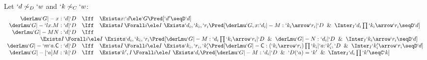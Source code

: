 \documentclass{lmcs}
\begin{document}
\newpage

\def\derLmuInt{\derLmu}

 \begin{lem} \label{mu gen Lemma} \label{gen lemma}
Let $`d \not\sim_D `w$ and $`k \not\sim_C`w$:
%
 \[ \begin{array}{rcl}
\derLmuInt `G |- x : `d | `D &\Iff& \Exists x{:}`d \ele `G \Pred[ `d' \seqD `d ]
	\\
\derLmuInt `G |- `lx.M : `d | `D &\Iff& 
\Exists I \, \Forall i \ele I ~ \Exists `d_i,`k_i,`r_i \Pred[ \derLmuInt `G, x{:}`d_i |- M : `k_i\arrow `r_i | `D \And \Inter_I `d_i\prod `k_i\arrow `r_i \seqD `d ] 
	\\
\derLmuInt `G |- MN : `d | `D &\Iff& 
\\ \multicolumn{3}{r} {
\Exists I \, \Forall i \ele I ~ \Exists `d_i,`k_i,`r_i \Pred[ \derLmuInt `G |- M : `d_i\prod `k_i\arrow `r_i | `D \And \derLmuInt `G |- N : `d_i | `D \And \Inter_I`k_i\arrow `r_i \seqD `d ] 
}
\quad
	\\
\derLmuInt `G |- `m`a.{\Cmd} : `d | `D &\Iff& 
\Exists I \, \Forall i \ele I ~ \Exists `k_i,`r_i, `k'_i \Pred[ \derLmuInt `G |- {\Cmd} : (`k_i\arrow `r_i)\prod `k_i | `a{:}`k'_i, `D \And \Inter_I`k'_i\arrow `r_i \seqD `d ] 
	\\
\derLmuInt `G |- [`a]M : `k | `D &\Iff& 
\Exists `k',I \, \Forall i \ele I ~ \Exists `d_i \Pred[ \derLmuInt `G |- M : `d_i | `D \And `D(`a) = `k'  \And \Inter_I `d_i\prod `k' \seqC `k ] 
 \end{array} \]
 \end{lem}
\end{document}
